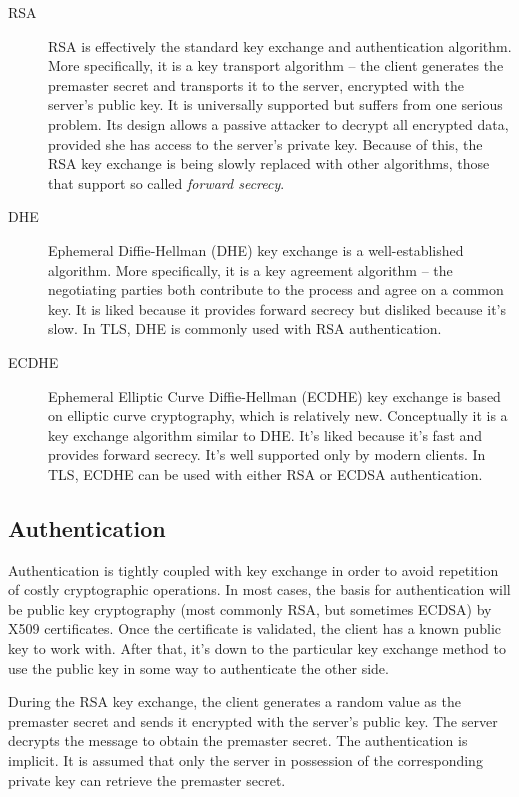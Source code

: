 \begin{description}
  \item[RSA] RSA is effectively the standard key exchange and authentication algorithm. More specifically, it is a key transport algorithm -- the client generates the premaster secret and transports it to the server, encrypted with the server's public key. It is universally supported but suffers from one serious problem. Its design allows a passive attacker to decrypt all encrypted data, provided she has access to the server's private key. Because of this, the RSA key exchange is being slowly replaced with other algorithms, those that support so called \textit{forward secrecy}.
  \item[DHE] Ephemeral Diffie-Hellman (DHE) key exchange is a well-established algorithm. More specifically, it is a key agreement algorithm -- the negotiating parties both contribute to the process and agree on a common key. It is liked because it provides forward secrecy but disliked because it's slow. In TLS, DHE is commonly used with RSA authentication.
  \item[ECDHE] Ephemeral Elliptic Curve Diffie-Hellman (ECDHE) key exchange is based on elliptic curve cryptography, which is relatively new. Conceptually it is a key exchange algorithm similar to DHE. It's liked because it's fast and provides forward secrecy. It's well supported only by modern clients. In TLS, ECDHE can be used with either RSA or ECDSA authentication. \cite{ristic2014bulletproof}
\end{description}

\subsection{Authentication}

Authentication is tightly coupled with key exchange in order to avoid repetition of costly cryptographic operations. In most cases, the basis for authentication will be public key cryptography (most commonly RSA, but sometimes ECDSA) by X509 certificates. Once the certificate is validated, the client has a known public key to work with. After that, it's down to the particular key exchange method to use the public key in some way to authenticate the other side.

During the RSA key exchange, the client generates a random value as the premaster secret and sends it encrypted with the server's public key. The server decrypts the message to obtain the premaster secret. The authentication is implicit. It is assumed that only the server in possession of the corresponding private key can retrieve the premaster secret.

